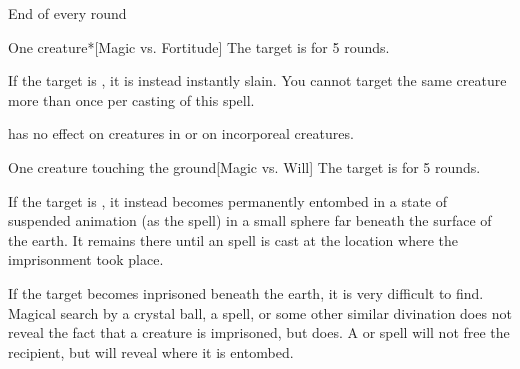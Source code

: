 \begin{spellheader}
    \spellrng{\rngclose}
\end{spellheader}
\begin{spelleffects}
    \begin{spelltrigger}{End of every round}
        \begin{spelltarget}{One creature}*[Magic vs. Fortitude]
            \spellsuccess The target is \staggered for 5 rounds.

            If the target is \bloodied, it is instead instantly slain.
            \spellspecial You cannot target the same creature more than once per casting of this spell.
        \end{spelltarget}
    \end{spelltrigger}
\end{spelleffects}
\begin{spellfooter}
    \spellnotes {} has no effect on creatures in  or on incorporeal creatures.
\end{spellfooter}

\begin{spellheader}
    \spellrng{\rngclose}
\end{spellheader}
\begin{spelleffects}
    \begin{spelltarget}{One creature touching the ground}[Magic vs. Will]
        \spellsuccess The target is \slowed for 5 rounds.

        \spellsuccess If the target is \bloodied, it instead becomes permanently entombed in a state of suspended animation (as the  spell) in a small sphere far beneath the surface of the earth. It remains there until an  spell is cast at the location where the imprisonment took place.
    \end{spelltarget}

\end{spelleffects}
\begin{spellfooter}
    \spellnotes If the target becomes inprisoned beneath the earth, it is very difficult to find. Magical search by a crystal ball, a  spell, or some other similar divination does not reveal the fact that a creature is imprisoned, but  does. A  or  spell will not free the recipient, but will reveal where it is entombed.
\end{spellfooter}

